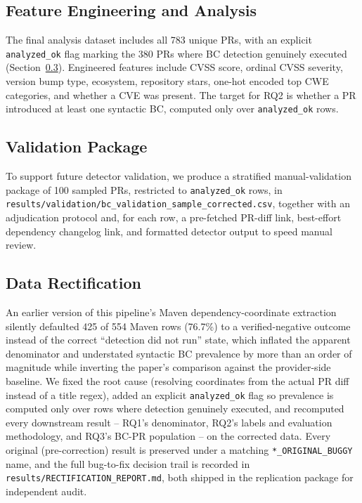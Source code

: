 \documentclass[10pt,journal]{IEEEtran}
\begin{document}
\subsection{Feature Engineering and Analysis}
The final analysis dataset includes all 783 unique PRs, with an explicit \texttt{analyzed\_ok} flag marking the 380 PRs where BC detection genuinely executed (Section~\ref{sec:rectification}). Engineered features include CVSS score, ordinal CVSS severity, version bump type, ecosystem, repository stars, one-hot encoded top CWE categories, and whether a CVE was present. The target for RQ2 is whether a PR introduced at least one syntactic BC, computed only over \texttt{analyzed\_ok} rows.

\subsection{Validation Package}
To support future detector validation, we produce a stratified manual-validation package of 100 sampled PRs, restricted to \texttt{analyzed\_ok} rows, in \texttt{results/validation/bc\_validation\_sample\_corrected.csv}, together with an adjudication protocol and, for each row, a pre-fetched PR-diff link, best-effort dependency changelog link, and formatted detector output to speed manual review.

\subsection{Data Rectification}
\label{sec:rectification}
An earlier version of this pipeline's Maven dependency-coordinate extraction silently defaulted 425 of 554 Maven rows (76.7\%) to a verified-negative outcome instead of the correct ``detection did not run'' state, which inflated the apparent denominator and understated syntactic BC prevalence by more than an order of magnitude while inverting the paper's comparison against the provider-side baseline. We fixed the root cause (resolving coordinates from the actual PR diff instead of a title regex), added an explicit \texttt{analyzed\_ok} flag so prevalence is computed only over rows where detection genuinely executed, and recomputed every downstream result -- RQ1's denominator, RQ2's labels and evaluation methodology, and RQ3's BC-PR population -- on the corrected data. Every original (pre-correction) result is preserved under a matching \texttt{*\_ORIGINAL\_BUGGY} name, and the full bug-to-fix decision trail is recorded in \texttt{results/RECTIFICATION\_REPORT.md}, both shipped in the replication package for independent audit.
\end{document}

